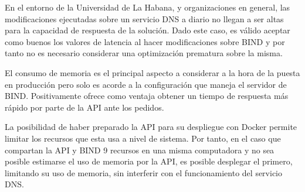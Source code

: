 En el entorno de la Universidad de La Habana, y organizaciones en general, las modificaciones ejecutadas sobre un servicio DNS a diario no llegan a ser altas para la capacidad de respuesta de la solución. Dado este caso, es válido aceptar como buenos los valores de latencia al hacer modificaciones sobre BIND y por tanto no es necesario considerar una optimización prematura sobre la misma.

El consumo de memoria es el principal aspecto a considerar a la hora de la puesta en producción pero solo es acorde a la configuración que maneja el servidor de BIND. Positivamente ofrece como ventaja obtener un tiempo de respuesta más rápido por parte de la API ante los pedidos.

La posibilidad de haber preparado la API para su despliegue con Docker permite limitar los recursos que esta usa a nivel de sistema. Por tanto, en el caso que compartan la API y BIND 9 recursos en una misma computadora y no sea posible estimarse el uso de memoria por la API, es posible desplegar el primero, limitando su uso de memoria, sin interferir con el funcionamiento del servicio DNS.
